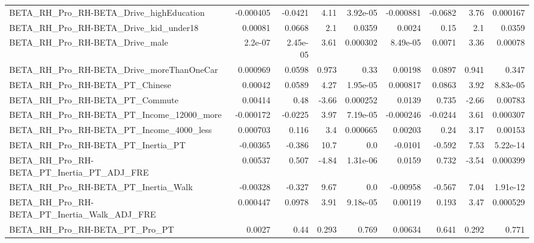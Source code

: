 \begin{tabular}{lrrrrrrrr}
BETA\_RH\_Pro\_RH-BETA\_Drive\_highEducation            &   -0.000405 &      -0.0421 &     4.11 & 3.92e-05 &  -0.000881 &     -0.0682 &         3.76 &      0.000167 \\
BETA\_RH\_Pro\_RH-BETA\_Drive\_kid\_under18              &     0.00081 &       0.0668 &      2.1 &   0.0359 &     0.0024 &        0.15 &          2.1 &        0.0359 \\
BETA\_RH\_Pro\_RH-BETA\_Drive\_male                     &     2.2e-07 &     2.45e-05 &     3.61 & 0.000302 &   8.49e-05 &      0.0071 &         3.36 &       0.00078 \\
BETA\_RH\_Pro\_RH-BETA\_Drive\_moreThanOneCar           &    0.000969 &       0.0598 &    0.973 &     0.33 &    0.00198 &      0.0897 &        0.941 &         0.347 \\
BETA\_RH\_Pro\_RH-BETA\_PT\_Chinese                     &     0.00042 &       0.0589 &     4.27 & 1.95e-05 &   0.000817 &      0.0863 &         3.92 &      8.83e-05 \\
BETA\_RH\_Pro\_RH-BETA\_PT\_Commute                     &     0.00414 &         0.48 &    -3.66 & 0.000252 &     0.0139 &       0.735 &        -2.66 &       0.00783 \\
BETA\_RH\_Pro\_RH-BETA\_PT\_Income\_12000\_more           &   -0.000172 &      -0.0225 &     3.97 & 7.19e-05 &  -0.000246 &     -0.0244 &         3.61 &      0.000307 \\
BETA\_RH\_Pro\_RH-BETA\_PT\_Income\_4000\_less            &    0.000703 &        0.116 &      3.4 & 0.000665 &    0.00203 &        0.24 &         3.17 &       0.00153 \\
BETA\_RH\_Pro\_RH-BETA\_PT\_Inertia\_PT                  &    -0.00365 &       -0.386 &     10.7 &      0.0 &    -0.0101 &      -0.592 &         7.53 &      5.22e-14 \\
BETA\_RH\_Pro\_RH-BETA\_PT\_Inertia\_PT\_ADJ\_FRE          &     0.00537 &        0.507 &    -4.84 & 1.31e-06 &     0.0159 &       0.732 &        -3.54 &      0.000399 \\
BETA\_RH\_Pro\_RH-BETA\_PT\_Inertia\_Walk                &    -0.00328 &       -0.327 &     9.67 &      0.0 &   -0.00958 &      -0.567 &         7.04 &      1.91e-12 \\
BETA\_RH\_Pro\_RH-BETA\_PT\_Inertia\_Walk\_ADJ\_FRE        &    0.000447 &       0.0978 &     3.91 & 9.18e-05 &    0.00119 &       0.193 &         3.47 &      0.000529 \\
BETA\_RH\_Pro\_RH-BETA\_PT\_Pro\_PT                      &      0.0027 &         0.44 &    0.293 &    0.769 &    0.00634 &       0.641 &        0.292 &         0.771 \\

\end{tabular}
